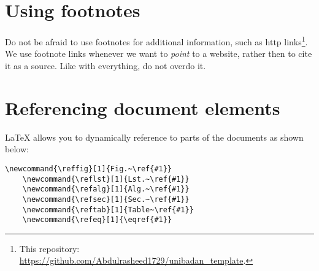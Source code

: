 \section{Using footnotes}

Do not be afraid to use footnotes for additional information, such as http links\footnote{This repository: \url{https://github.com/Abdulrasheed1729/unibadan_template}.}.
We use footnote links whenever we want to \emph{point} to a website, rather then to cite it as a source.
Like with everything, do not overdo it.

\section{Referencing document elements}

LaTeX allows you to dynamically reference to parts of the documents as shown below:
\begin{lstlisting}[caption={LaTeX macros for referencing to document elements.},label={lst:references}]
    \newcommand{\reffig}[1]{Fig.~\ref{#1}}
    \newcommand{\reflst}[1]{Lst.~\ref{#1}}
    \newcommand{\refalg}[1]{Alg.~\ref{#1}}
    \newcommand{\refsec}[1]{Sec.~\ref{#1}}
    \newcommand{\reftab}[1]{Table~\ref{#1}}
    \newcommand{\refeq}[1]{\eqref{#1}}
  \end{lstlisting}


